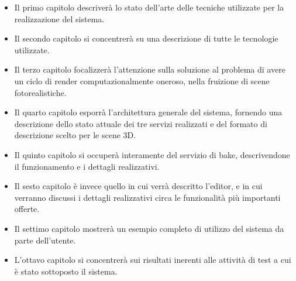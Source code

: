 \begin{itemize}
\item Il primo capitolo descriverà lo stato dell’arte delle tecniche utilizzate per la realizzazione del sistema.
\item Il secondo capitolo si concentrerà su una descrizione di tutte le tecnologie utilizzate.
\item Il terzo capitolo focalizzerà l’attenzione sulla soluzione al problema di avere un ciclo di render computazionalmente oneroso, nella fruizione di scene fotorealistiche. 
\item Il quarto capitolo esporrà l’architettura generale del sistema, fornendo una descrizione dello stato attuale dei tre servizi realizzati e del formato di descrizione scelto per le scene 3D. 
\item Il quinto capitolo si occuperà interamente del servizio di bake, descrivendone il funzionamento e i dettagli realizzativi.
\item Il sesto capitolo è invece quello in cui verrà descritto l’editor, e in cui verranno discussi i dettagli realizzativi circa le funzionalità più importanti offerte.
\item Il settimo capitolo mostrerà un esempio completo di utilizzo del sistema da parte dell’utente.
\item L’ottavo capitolo si concentrerà sui risultati inerenti alle attività di test a cui è stato sottoposto il sistema.
\end{itemize}
